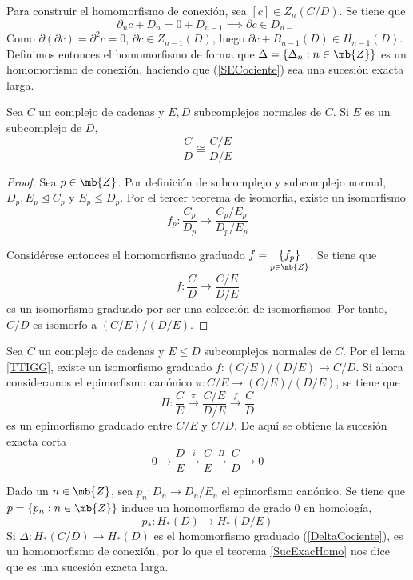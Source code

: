 Para construir el homomorfismo de conexión, sea $[c] \in Z_n(C/D)$. Se tiene que $$\partial_n c+D_n=0+D_{n-1} \implies \partial c \in D_{n-1}$$ Como $\partial(\partial c)=\partial^2c=0$, $\partial c \in Z_{n-1}(D)$, luego $\partial c+B_{n-1}(D) \in H_{n-1}(D)$. Definimos entonces el homomorfismo  de forma que $\Delta=\{\Delta_n: n \in \mb{Z}\}$ es un homomorfismo de conexión, haciendo que (\ref{SECociente}) sea una sucesión exacta larga.

\begin{lema}\label{TTIGG}
Sea $C$ un complejo de cadenas y $E,D$ subcomplejos normales de $C$. Si $E$ es un subcomplejo de $D$, $$\frac{C}{D} \cong \frac{C/E}{D/E}$$
\end{lema}

\begin{proof}
Sea $p \in \mb{Z}$. Por definición de subcomplejo y subcomplejo normal, $D_p,E_p \trianglelefteq C_p$ y $E_p \leq D_p$. Por el tercer teorema de isomorfia, existe un isomorfismo $$f_p: \frac{C_p}{D_p} \longrightarrow \frac{C_p/E_p}{D_p/E_p}$$

Considérese entonces el homomorfismo graduado $f=\underset{p \in \mb{Z}}{\{f_p\}}$. Se tiene que $$f: \frac{C}{D} \longrightarrow \frac{C/E}{D/E}$$ es un isomorfismo graduado por ser una colección de isomorfismos. Por tanto, $C/D$ es isomorfo a $(C/E)/(D/E)$.
\end{proof}

Sea $C$ un complejo de cadenas y $E \leq D$ subcomplejos normales de $C$. Por el lema \ref{TTIGG}, existe un isomorfismo graduado $f: (C/E)/(D/E) \longrightarrow C/D$. Si ahora consideramos el epimorfismo canónico $\pi: C/E \longrightarrow (C/E)/(D/E)$, se tiene que $$\Pi: \frac{C}{E} \xrightarrow{\pi} \frac{C/E}{D/E} \xrightarrow{f} \frac{C}{D}$$ es un epimorfismo graduado entre $C/E$ y $C/D$. De aquí se obtiene la sucesión exacta corta $$0 \longrightarrow \frac{D}{E} \xrightarrow{i} \frac{C}{E} \xrightarrow{\Pi}\frac{C}{D} \longrightarrow 0$$

Dado un $n \in \mb{Z}$, sea $p_n: D_n \longrightarrow D_n/E_n$ el epimorfismo canónico. Se tiene que $p=\{p_n: n \in \mb{Z}\}$ induce un homomorfismo de grado 0 en homología, $$p_*: H_*(D) \longrightarrow H_*(D/E)$$ Si $\Delta: H_*(C/D) \longrightarrow H_*(D)$ es el homomorfismo graduado (\ref{DeltaCociente}),  es un homomorfismo de conexión, por lo que el teorema \ref{SucExacHomo} nos dice que  es una sucesión exacta larga.
\\

